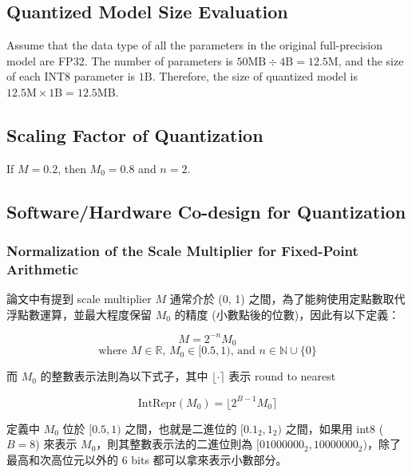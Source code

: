 \documentclass[12pt]{article}
\begin{document}
\subsection{Quantized Model Size Evaluation}

Assume that the data type of all the parameters in the original full-precision model are FP32.
The number of parameters is $50\text{MB} \div 4\text{B} = 12.5\text{M}$, and the size of each INT8 parameter is $1\text{B}$.
Therefore, the size of quantized model is $12.5\text{M} \times 1\text{B} = 12.5\text{MB}$.

\subsection{Scaling Factor of Quantization}

If $M = 0.2$, then $M_0 = 0.8$ and $n = 2$.

\subsection{Software/Hardware Co-design for Quantization}

\subsubsection{Normalization of the Scale Multiplier for Fixed-Point Arithmetic}

論文中有提到 scale multiplier $M$ 通常介於 (0, 1) 之間，為了能夠使用定點數取代浮點數運算，並最大程度保留 $M_0$ 的精度 (小數點後的位數)，因此有以下定義：

\begin{equation}
M = 2^{-n} M_0
\label{eq:1}
\end{equation}
$$
\text{where } M \in \mathbb{R} \text{, } M_0 \in [0.5, 1) \text{, and } n \in \mathbb{N} \cup \{0\}
$$

而 $M_0$ 的整數表示法則為以下式子，其中 $\lfloor \cdot \rceil$ 表示 round to nearest

\begin{equation}
\text{IntRepr}(M_0) = \lfloor 2^{B-1} M_0 \rceil
\label{eq:2}
\end{equation}

定義中 $M_0$ 位於 $[0.5, 1)$ 之間，也就是二進位的 $[0.1_2, 1_2)$ 之間，如果用 int8 ($B = 8$) 來表示 $M_0$，則其整數表示法的二進位則為 $[01000000_2, 10000000_2)$，除了最高和次高位元以外的 6 bits 都可以拿來表示小數部分。
\end{document}

